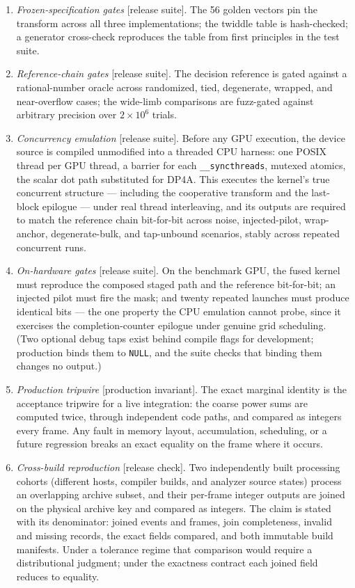 \begin{enumerate}
    \item \emph{Frozen-specification gates} [release suite]. The 56 golden vectors pin the transform across all three implementations; the twiddle table is hash-checked; a generator cross-check reproduces the table from first principles in the test suite.
    \item \emph{Reference-chain gates} [release suite]. The decision reference is gated against a rational-number oracle across randomized, tied, degenerate, wrapped, and near-overflow cases; the wide-limb comparisons are fuzz-gated against arbitrary precision over $2 \times 10^6$ trials.
    \item \emph{Concurrency emulation} [release suite]. Before any GPU execution, the device source is compiled unmodified into a threaded CPU harness: one POSIX thread per GPU thread, a barrier for each \texttt{\_\_syncthreads}, mutexed atomics, the scalar dot path substituted for DP4A. This executes the kernel's true concurrent structure --- including the cooperative transform and the last-block epilogue --- under real thread interleaving, and its outputs are required to match the reference chain bit-for-bit across noise, injected-pilot, wrap-anchor, degenerate-bulk, and tap-unbound scenarios, stably across repeated concurrent runs.
    \item \emph{On-hardware gates} [release suite]. On the benchmark GPU, the fused kernel must reproduce the composed staged path and the reference bit-for-bit; an injected pilot must fire the mask; and twenty repeated launches must produce identical bits --- the one property the CPU emulation cannot probe, since it exercises the completion-counter epilogue under genuine grid scheduling. (Two optional debug taps exist behind compile flags for development; production binds them to \texttt{NULL}, and the suite checks that binding them changes no output.)
    \item \emph{Production tripwire} [production invariant]. The exact marginal identity is the acceptance tripwire for a live integration: the coarse power sums are computed twice, through independent code paths, and compared as integers every frame. Any fault in memory layout, accumulation, scheduling, or a future regression breaks an exact equality on the frame where it occurs.
    \item \emph{Cross-build reproduction} [release check]. Two independently built processing cohorts (different hosts, compiler builds, and analyzer source states) process an overlapping archive subset, and their per-frame integer outputs are joined on the physical archive key and compared as integers. The claim is stated with its denominator: joined events and frames, join completeness, invalid and missing records, the exact fields compared, and both immutable build manifests. Under a tolerance regime that comparison would require a distributional judgment; under the exactness contract each joined field reduces to equality.

\end{enumerate}
